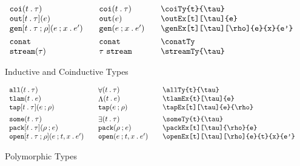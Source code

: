 \documentclass[11pt]{article}
\begin{document}
\begin{figure}
\begin{small}
\begin{displaymath}
\begin{array}{l@{\qquad}l@{\qquad}l@{\qquad}l}
        \coiTy{t}{\tau}                      & \coiTy*{t}{\tau}                    & \verb|\coiTy{t}{\tau}|                         \\
        \outEx[t][\tau]{e}                   & \outEx*{e}                          & \verb|\outEx[t][\tau]{e}|                      \\
        \genEx[t][\tau][\rho]{e}{x}{e'}    & \genEx*{e}{x}{e'}                   & \verb|\genEx[t][\tau][\rho]{e}{x}{e'}|       \\[1ex]

        \conatTy                             & \conatTy*                           & \verb|\conatTy|                                \\
        \streamTy{\tau}                      & \streamTy*{\tau}                    & \verb|\streamTy{\tau}|
      \end{array}
    \end{displaymath}
  \end{small}

  \caption{Inductive and Coinductive Types}
  \label{fig:icoi}
\end{figure}

\begin{figure}

  \begin{small}
    \begin{displaymath}
      \begin{array}{l@{\qquad}l@{\qquad}l@{\qquad}l}
        \allTy{t}{\tau}                     & \allTy*{t}{\tau}                     & \verb|\allTy{t}{\tau}|                     \\
        \tlamEx{t}[\tau]{e}                 & \tlamEx*{t}{e}                       & \verb|\tlamEx{t}[\tau]{e}|                 \\
        \tapEx[t][\tau]{e}{\rho}          & \tapEx*{e}{\rho}                   & \verb|\tapEx[t][\tau]{e}{\rho}|          \\[1ex]
        \someTy{t}{\tau}                    & \someTy*{t}{\tau}                    & \verb|\someTy{t}{\tau}|                    \\
        \packEx[t][\tau]{\rho}{e}           & \packEx*{\rho}{e}                    & \verb|\packEx[t][\tau]{\rho}{e}|           \\
        \openEx[t][\tau][\rho]{e}{t}{x}{e'} & \openEx*[t][\tau][\rho]{e}{t}{x}{e'} & \verb|\openEx[t][\tau][\rho]{e}{t}{x}{e'}|
      \end{array}
    \end{displaymath}
  \end{small}

  \caption{Polymorphic Types}
  \label{fig:poly}
\end{figure}
\end{document}
